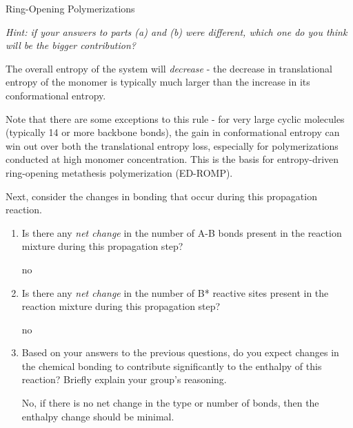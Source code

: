 \begin{activity}{Ring-Opening Polymerizations}
\begin{ctqs}
\begin{enumerate}
				\emph{Hint: if your answers to parts (a) and (b) were different, which one do you think will be the bigger contribution?}
			
				\begin{solution}[1.25in]
					The overall entropy of the system will \emph{decrease} - the decrease in translational entropy of the monomer is typically much larger than the increase in its conformational entropy.
					
					Note that there are some exceptions to this rule - for very large cyclic molecules (typically 14 or more backbone bonds), the gain in conformational entropy can win out over both the translational entropy loss, especially for polymerizations conducted at high monomer concentration.  This is the basis for entropy-driven ring-opening metathesis polymerization (ED-ROMP).
				\end{solution}
			
		\end{enumerate}

	\question Next, consider the changes in bonding that occur during this propagation reaction.
	
		\begin{enumerate}
		
			\item Is there any \emph{net change} in the number of A-B bonds present in the reaction mixture during this propagation step?
			
				\begin{solution}[0.3in]
					no
				\end{solution}
	
			\item Is there any \emph{net change} in the number of B* reactive sites present in the reaction mixture during this propagation step?
			
				\begin{solution}[0.3in]
					no
				\end{solution}
	
			\item Based on your answers to the previous questions, do you expect changes in the chemical bonding to contribute significantly to the enthalpy of this reaction? Briefly explain your group's reasoning.
			
				\begin{solution}[1.25in]
					No, if there is no net change in the type or number of bonds, then the enthalpy change should be minimal.
				\end{solution}
						

\end{enumerate}
\end{ctqs}
\end{activity}
